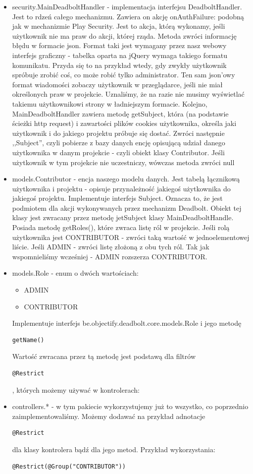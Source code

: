 \documentclass[a4paper,12pt,notitlepage]{mwrep}
\begin{document}
\begin{itemize}
	\item	security.MainDeadboltHandler - implementacja interfejsu DeadboltHandler. Jest to rdzeń całego mechanizmu. Zawiera on akcję onAuthFailure: podobną jak w mechanizmie Play Security. Jest to akcja, którą wykonamy, jeśli użytkownik nie ma praw do akcji, której rząda. Metoda zwróci informację błędu w formacie json. Format taki jest wymagany przez nasz webowy interfejs graficzny - tabelka oparta na jQuery wymaga takiego formatu komunikatu. Przyda się to na przykład wtedy, gdy zwykły użytkownik spróbuje zrobić coś, co może robić tylko administrator. Ten sam json'owy format wiadomości zobaczy użytkownik w przeglądarce, jeśli nie miał określonych praw w projekcie. Uznaliśmy, że na razie nie musimy wyświetlać takiemu użytkownikowi strony w ładniejszym formacie. Kolejno, MainDeadboltHandler zawiera metodę getSubject, która (na podstawie ścieżki http request) i zawartości plików cookies użytkownika, określa jaki użytkownik i do jakiego projektu próbuje się dostać. Zwróci następnie ,,Subject'', czyli pobierze z bazy danych encję opisującą udział danego użytkownika w danym projekcie - czyli obiekt klasy Contributor. Jeśli użytkownik w tym projekcie nie uczestniczy, wówczas metoda zwróci null
	\item	models.Contributor - encja naszego modelu danych. Jest tabelą łącznikową użytkownika i projektu - opisuje przynależność jakiegoś użytkownika do jakiegoś projektu. Implementuje interfejs Subject. Oznacza to, że jest podmiotem dla akcji wykonywanych przez mechanizm Deadbolt. Obiekt tej klasy jest zwracany przez metodę jetSubject klasy MainDeadboltHandle. Posiada metodę getRoles(), które zwraca listę ról w projekcie. Jeśli rolą użytkownika jest CONTRIBUTOR - zwróci taką wartość w jednoelementowej liście. Jeśli ADMIN - zwróci listę złożoną z obu tych ról. Tak jak wspomnieliśmy wcześniej - ADMIN rozszerza CONTRIBUTOR.
	\item	models.Role - enum o dwóch wartościach: 
	\begin{itemize}
		\item	ADMIN
		\item	CONTRIBUTOR
	\end{itemize}
	Implementuje interfejs be.objectify.deadbolt.core.models.Role i jego metodę \begin{verbatim}getName()\end{verbatim} Wartość zwracana przez tą metodę jest podstawą dla filtrów \begin{verbatim}@Restrict\end{verbatim}, których możemy używać w kontrolerach:
	\item	controllers.*  - w tym pakiecie wykorzystujemy już to wszystko, co poprzednio zaimplementowaliśmy. Możemy dodawać na przykład adnotacje \begin{verbatim}@Restrict\end{verbatim} dla klasy kontrolera bądź dla jego metod. Przykład wykorzystania: \begin{verbatim}@Restrict(@Group("CONTRIBUTOR")) \end{verbatim}
\end{itemize}
\end{document}
